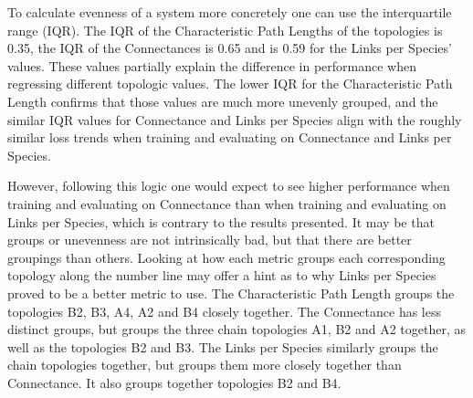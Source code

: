 \documentclass[letterpaper, 10 pt, conference]{ieeeconf}  %
\begin{document}
    To calculate evenness of a system more concretely one can use the interquartile range (IQR). The IQR of the Characteristic Path Lengths of the topologies is 0.35, the IQR of the Connectances is 0.65 and is 0.59 for the Links per Species’ values. These values partially explain the difference in performance when regressing different topologic values. The lower IQR  for the Characteristic Path Length confirms that those values are much more unevenly grouped, and the similar IQR values for Connectance and Links per Species align with the roughly similar loss trends when training and evaluating on Connectance and Links per Species. 
    
    However, following this logic one would expect to see higher performance when training and evaluating on Connectance than when training and evaluating on Links per Species, which is contrary to the results presented. It may be that groups or unevenness are not intrinsically bad, but that there are better groupings than others. Looking at how each metric groups each corresponding topology along the number line may offer a hint as to why Links per Species proved to be a better metric to use. The Characteristic Path Length groups the topologies B2, B3, A4, A2 and B4 closely together. The Connectance has less distinct groups, but groups the three chain topologies A1, B2 and A2 together, as well as the topologies B2 and B3. The Links per Species similarly groups the chain topologies together, but groups them more closely together than Connectance. It also groups together topologies B2 and B4. 
    
\end{document}
